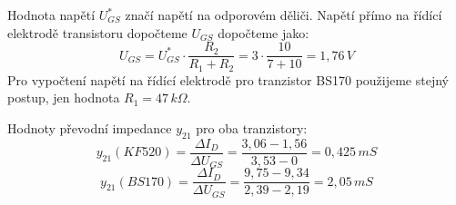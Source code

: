 \documentclass[12pt]{article} %
\begin{document}
Hodnota napětí $U_{GS}^*$ značí napětí na odporovém děliči. Napětí přímo na řídící elektrodě transistoru dopočteme $U_{GS}$ dopočteme jako:
\begin{equation}
U_{GS} = U_{GS}^* \cdot \frac{R_2}{R_1+R_2} = 3 \cdot \frac{10}{7+10} = 1,76\,V
\end{equation}
Pro vypočtení napětí na řídící elektrodě pro tranzistor BS170 použijeme stejný postup, jen hodnota $R_1 = 47\,k\Omega$.

Hodnoty převodní impedance $y_{21}$ pro oba tranzistory:
\begin{equation}
y_{21}(KF520) = \frac{\Delta I_D}{\Delta U_{GS}} = \frac{3,06-1,56}{3,53-0} = 0,425\,mS
\end{equation}
\begin{equation}
y_{21}(BS170) = \frac{\Delta I_D}{\Delta U_{GS}} = \frac{9,75-9,34}{2,39-2,19} = 2,05\,mS
\end{equation}
\end{document}

